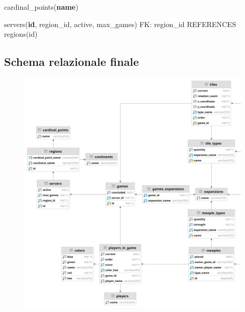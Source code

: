 cardinal\_points(\textbf{name})\newline

servers(\textbf{id}, region\_id, active, max\_games)\newline
FK: region\_id REFERENCES regions(id)

\subsection{Schema relazionale finale}
\clearpage
\begin{figure}[ht]
    \includegraphics[scale=0.175]{images/Progettazione/relazionale_left.png}
\end{figure}
\clearpage
